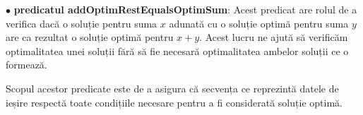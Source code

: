 $\bullet$ \textbf{predicatul addOptimRestEqualsOptimSum}: Acest predicat are rolul de a verifica dacă o soluție pentru suma $x$ 
adunată cu o soluție optimă pentru suma $y$ are ca rezultat o soluție optimă pentru $x+y$. Acest lucru ne ajută să verificăm 
optimalitatea unei soluții fără să fie necesară optimalitatea ambelor soluții ce o formează.\par
Scopul acestor predicate este de a asigura că secvența ce reprezintă datele de ieșire respectă toate condițiile necesare
pentru a fi considerată soluție optimă.
    